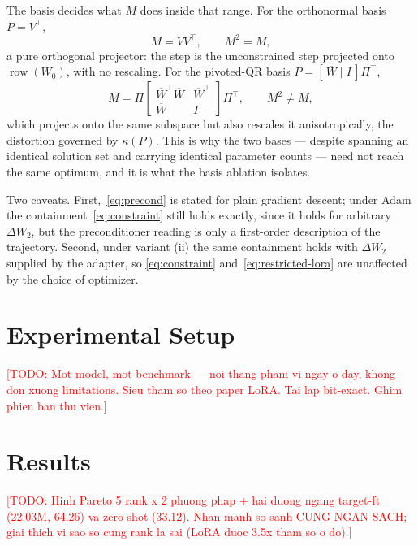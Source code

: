 \documentclass{article}
\newcommand{\TODO}[1]{\textcolor{red}{[TODO: #1]}}
\begin{document}
The basis decides what $M$ does inside that range. For the orthonormal basis
$P=V^{\top}$,
\[
  M=VV^{\top},\qquad M^2=M,
\]
a pure orthogonal projector: the step is the unconstrained step projected onto
$\operatorname{row}(W_0)$, with no rescaling. For the pivoted-QR basis
$P=[\,\overline{W}\mid I\,]\Pi^{\top}$,
\[
  M=\Pi\begin{bmatrix}
        \overline{W}^{\top}\overline{W} & \overline{W}^{\top}\\
        \overline{W} & I
      \end{bmatrix}\Pi^{\top},
  \qquad M^2\neq M,
\]
which projects onto the same subspace but also rescales it anisotropically, the
distortion governed by $\kappa(P)$. This is why the two bases --- despite
spanning an identical solution set and carrying identical parameter counts ---
need not reach the same optimum, and it is what the basis ablation isolates.

Two caveats. First,~\eqref{eq:precond} is stated for plain gradient descent;
under Adam the containment~\eqref{eq:constraint} still holds exactly, since it
holds for arbitrary $\Delta W_2$, but the preconditioner reading is only a
first-order description of the trajectory. Second, under variant (ii) the same
containment holds with $\Delta W_2$ supplied by the adapter, so
\eqref{eq:constraint} and~\eqref{eq:restricted-lora} are unaffected by the
choice of optimizer.

\section{Experimental Setup}
\TODO{Mot model, mot benchmark — noi thang pham vi ngay o day, khong don
      xuong limitations. Sieu tham so theo paper LoRA. Tai lap bit-exact.
      Ghim phien ban thu vien.}

\section{Results}
\TODO{Hinh Pareto 5 rank x 2 phuong phap + hai duong ngang target-ft
      (22.03M, 64.26) va zero-shot (33.12). Nhan manh so sanh CUNG NGAN SACH;
      giai thich vi sao so cung rank la sai (LoRA duoc 3.5x tham so o do).}
\end{document}
